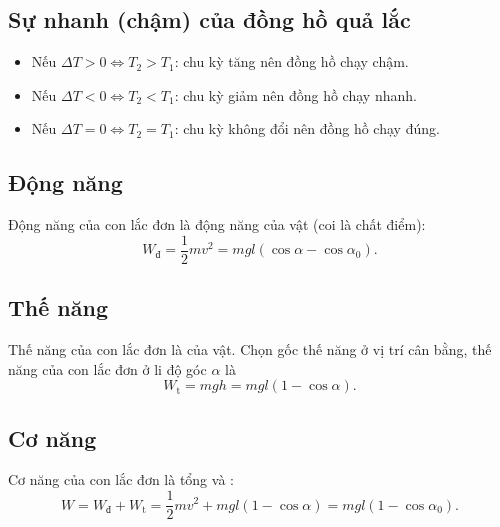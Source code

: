 \subsection{Sự nhanh (chậm) của đồng hồ quả lắc}
\begin{itemize}
	\item Nếu $\Delta T>0 \Leftrightarrow T_2>T_1$: chu kỳ tăng nên đồng hồ chạy chậm.
	\item Nếu $\Delta T<0 \Leftrightarrow T_2<T_1$: chu kỳ giảm nên đồng hồ chạy nhanh.
	\item Nếu $\Delta T =0 \Leftrightarrow T_2=T_1$: chu kỳ không đổi nên đồng hồ chạy đúng.
\end{itemize}
\subsection{Động năng}
Động năng của con lắc đơn là động năng của vật (coi là chất điểm):
\begin{equation*}
	W_{\text{đ}} = \dfrac {1}{2}mv^2=mgl (\cos \alpha - \cos \alpha_0).
\end{equation*}
\subsection{Thế năng}
Thế năng của con lắc đơn là  của vật. Chọn gốc thế năng ở vị trí cân bằng, thế năng của con lắc đơn ở li độ góc $\alpha$ là
\begin{equation*}
	W_\text{t}=mgh = mgl(1-\cos \alpha).
\end{equation*}
\subsection{Cơ năng}
Cơ năng của con lắc đơn là tổng  và :
\begin{equation*}
	W =W_{\text{đ}}+W_{\text{t}}= \dfrac {1}{2}mv^2 + mgl(1-\cos \alpha) =mgl(1-\cos \alpha_0).
\end{equation*}
